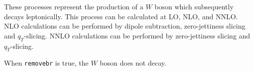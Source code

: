 \label{subsec:wboson}

These processes represent the production of a $W$ boson which subsequently
decays leptonically. 
This process can be calculated at LO, NLO, and NNLO.
NLO calculations can be performed by dipole subtraction, 
zero-jettiness slicing and $q_T$-slicing.
NNLO calculations can be performed by  zero-jettiness slicing and $q_T$-slicing.

When {\tt removebr} is true, the $W$ boson does not decay.
